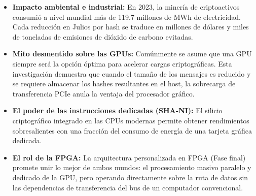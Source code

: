\documentclass[11pt,a4paper]{article}
\begin{document}
\begin{itemize}[leftmargin=*]
    \item \textbf{Impacto ambiental e industrial:} En 2023, la minería de criptoactivos consumió a nivel mundial más de 119.7 millones de MWh de electricidad. Cada reducción en Julios por hash se traduce en millones de dólares y miles de toneladas de emisiones de dióxido de carbono evitadas.
    \item \textbf{Mito desmentido sobre las GPUs:} Comúnmente se asume que una GPU siempre será la opción óptima para acelerar cargas criptográficas. Esta investigación demuestra que cuando el tamaño de los mensajes es reducido y se requiere almacenar los hashes resultantes en el host, la sobrecarga de transferencia PCIe anula la ventaja del procesador gráfico.
    \item \textbf{El poder de las instrucciones dedicadas (SHA-NI):} El silicio criptográfico integrado en las CPUs modernas permite obtener rendimientos sobresalientes con una fracción del consumo de energía de una tarjeta gráfica dedicada.
    \item \textbf{El rol de la FPGA:} La arquitectura personalizada en FPGA (Fase final) promete unir lo mejor de ambos mundos: el procesamiento masivo paralelo y dedicado de la GPU, pero operando directamente sobre la ruta de datos sin las dependencias de transferencia del bus de un computador convencional.
\end{itemize}
\end{document}
